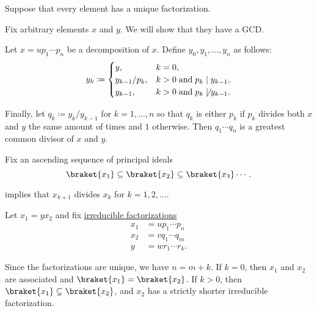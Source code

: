 \begin{defproof}
   Suppose that every element has a unique factorization.

   Fix arbitrary elements \( x \) and \( y \). We will show that they have a GCD.

  Let \( x = u p_1 \cdots p_n \) be a decomposition of \( x \). Define \( y_0, y_1, \ldots, y_n \) as follows:
  \begin{equation*}
    y_k \coloneqq \begin{cases}
      y,             &k = 0, \\
      y_{k-1} / p_k, &k > 0 \T{and} p_k \mid y_{k-1}, \\
      y_{k-1},       &k > 0 \T{and} p_k \not\mid y_{k-1}.
    \end{cases}
  \end{equation*}

  Finally, let \( q_k \coloneqq y_k / y_{k-1} \) for \( k = 1, \ldots, n \) so that \( q_k \) is either \( p_k \) if \( p_k \) divides both \( x \) and \( y \) the same amount of times and \( 1 \) otherwise. Then \( q_1 \cdots q_n \) is a greatest common divisor of \( x \) and \( y \).

   Fix an ascending sequence of principal ideals
  \begin{equation*}
    \braket{ x_1 } \subseteq \braket{ x_2 } \subseteq \braket{ x_3 } \cdots.
  \end{equation*}

   implies that \( x_{k+1} \) divides \( x_k \) for \( k = 1, 2, \ldots \).

  Let \( x_1 = y x_2 \) and fix \hyperref[def:irreducible_factorization]{irreducible factorizations}
  \begin{align*}
    x_1 &= u p_1 \cdots p_n \\
    x_2 &= v q_1 \cdots q_m \\
    y   &= w r_1 \cdots r_k.
  \end{align*}

  Since the factorizations are unique, we have \( n = m + k \). If \( k = 0 \), then \( x_1 \) and \( x_2 \) are associated and \( \braket{ x_1 } = \braket{ x_2 } \). If \( k > 0 \), then \( \braket{ x_1 } \subsetneq \braket{ x_2 } \), and \( x_2 \) has a strictly shorter irreducible factorization.


\end{defproof}
